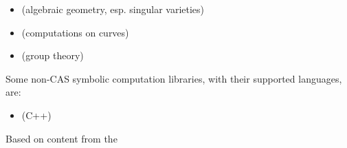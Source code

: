 \documentclass{article}
\begin{document}
\begin{itemize}

\item {} (algebraic geometry, esp. singular varieties)
\item {} (computations on curves)
\item {} (group theory)

\end{itemize}

Some non-CAS symbolic computation libraries, with their supported languages, are:

\begin{itemize}
\item {} (C++)
\end{itemize}

\begin{thebibliography}{3}

 Based on content from the 

\end{thebibliography}
\end{document}
